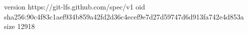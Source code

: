 version https://git-lfs.github.com/spec/v1
oid sha256:90c4f83c1aef934b859a42fd2d36c4ecef9e7d27d59747d6d913fa742e4d853a
size 12918
